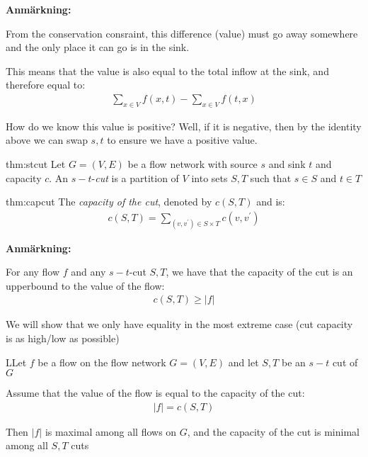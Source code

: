 \par\bigskip
\noindent\textbf{Anmärkning:}\par
\noindent From the conservation consraint, this difference (value) must go away somewhere and the only place it can go is in the sink.
\par\bigskip
\noindent This means that the value is also equal to the total inflow at the sink, and therefore equal to:
\begin{equation*}
  \begin{gathered}
    \sum_{x\in V}f(x,t)-\sum_{x\in V}f(t,x)
  \end{gathered}
\end{equation*}
\par\bigskip
\noindent How do we know this value is positive? Well, if it is negative, then by the identity above we can swap $s,t$ to ensure we have a positive value.
\par\bigskip
\begin{theo}[$s-t$-cut]{thm:stcut}
  Let $G = (V,E)$ be a flow network with source $s$ and sink $t$ and capacity $c$.
  \noindent An $s-t$-\textit{cut} is a partition of $V$ into sets $S,T$ such that $s\in S$ and $t\in T$ 
\end{theo}
\par\bigskip
\begin{theo}{thm:capcut}
  The \textit{capacity of the cut}, denoted by $c(S,T)$ and is:
  \begin{equation*}
    \begin{gathered}
      c(S,T) = \sum_{(v,v^{\prime})\in S\times T}c(v,v^{\prime})
    \end{gathered}
  \end{equation*}
\end{theo}
\par\bigskip
\noindent\textbf{Anmärkning:}\par
\noindent For any flow $f$ and any $s-t$-cut $S,T$, we have that the capacity of the cut is an upperbound to the value of the flow:
\begin{equation*}
  \begin{gathered}
    c(S,T)\geq \left|f\right|
  \end{gathered}
\end{equation*}
\par\bigskip
\noindent We will show that we only have equality in the most extreme case (cut capacity is as high/low as possible)
\newpage
\begin{lem}
  LLet $f$ be a flow on the flow network $G = (V,E)$ and let $S,T$ be an $s-t$ cut of $G$
  \par\bigskip
  \noindent Assume that the value of the flow is equal to the capacity of the cut:
  \begin{equation*}
    \begin{gathered}
      \left|f\right| = c(S,T)
    \end{gathered}
  \end{equation*}
  \par\bigskip
  \noindent Then $\left|f\right|$ is maximal among all flows on $G$, and the capacity of the cut is minimal among all $S,T$ cuts 
\end{lem}
